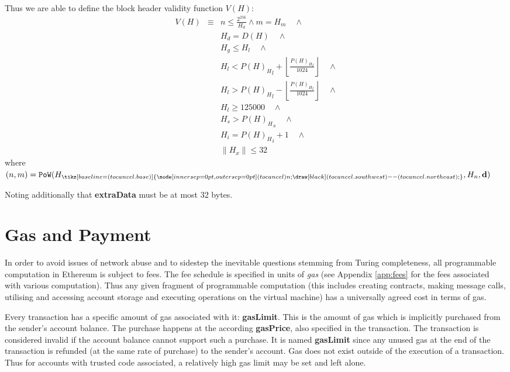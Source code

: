 \documentclass[9pt,oneside]{amsart}
\newcommand{\hcancel}[1]{%
    \tikz[baseline=(tocancel.base)]{
        \node[inner sep=0pt,outer sep=0pt] (tocancel) {#1};
        \draw[black] (tocancel.south west) -- (tocancel.north east);
    }%
}%
\begin{document}
\begin{multicols}{2}
Thus we are able to define the block header validity function $V(H)$:
\begin{eqnarray}
V(H) & \equiv &  n \leqslant \frac{2^{256}}{H_d} \wedge m = H_m \quad \wedge \\
& & H_d = D(H) \quad \wedge \\
& & H_g \le H_l  \quad \wedge \\
& & H_l < {P(H)_H}_l + \left\lfloor\frac{{P(H)_H}_l}{1024}\right\rfloor  \quad \wedge \\
& & H_l > {P(H)_H}_l - \left\lfloor\frac{{P(H)_H}_l}{1024}\right\rfloor  \quad \wedge \\
& & H_l \geqslant 125000  \quad \wedge \\
& & H_s > {P(H)_H}_s \quad \wedge \\
& & H_i = {P(H)_H}_i +1 \quad \wedge \\
& & \lVert H_x \rVert \le 32
\end{eqnarray}
where $(n, m) = \mathtt{PoW}(H_{\hcancel{n}}, H_n, \mathbf{d})$

Noting additionally that \textbf{extraData} must be at most 32 bytes.

\section{Gas and Payment} \label{ch:payment}

In order to avoid issues of network abuse and to sidestep the inevitable questions stemming from Turing completeness, all programmable computation in Ethereum is subject to fees. The fee schedule is specified in units of \textit{gas} (see Appendix \ref{app:fees} for the fees associated with various computation). Thus any given fragment of programmable computation (this includes creating contracts, making message calls, utilising and accessing account storage and executing operations on the virtual machine) has a universally agreed cost in terms of gas.

Every transaction has a specific amount of gas associated with it: \textbf{gasLimit}. This is the amount of gas which is implicitly purchased from the sender's account balance. The purchase happens at the according \textbf{gasPrice}, also specified in the transaction. The transaction is considered invalid if the account balance cannot support such a purchase. It is named \textbf{gasLimit} since any unused gas at the end of the transaction is refunded (at the same rate of purchase) to the sender's account. Gas does not exist outside of the execution of a transaction. Thus for accounts with trusted code associated, a relatively high gas limit may be set and left alone.


\end{multicols}
\end{document}
